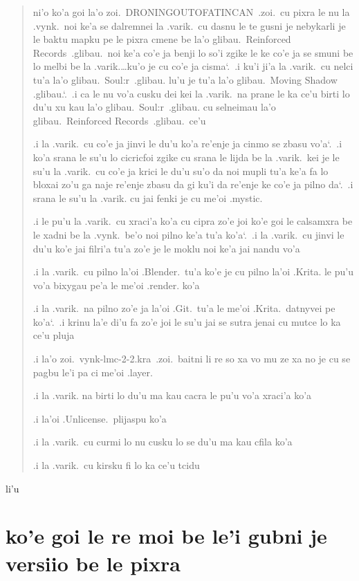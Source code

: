 \documentclass{report}
\newcommand\sds{\spacefactor\sfcode`.\ \space}
\begin{document}
\begin{quote}
	ni'o ko'a goi la'o zoi.\ DRONINGOUTOFATINCAN\ .zoi.\ cu pixra le nu la .vynk.\ noi ke'a se dalremnei la .varik.\ cu dasnu le te gusni je nebykarli je le baktu mapku pe le pixra cmene be la'o glibau.\ Reinforced Records\ .glibau.\ noi ke'a co'e ja benji lo so'i zgike le ke co'e ja se smuni be lo melbi be la .varik.\ldots ku'o je cu co'e ja cisma\sds  .i ku'i ji'a la .varik.\ cu nelci tu'a la'o glibau.\ Soul:r\ .glibau. lu'u je tu'a la'o glibau.\ Moving Shadow .glibau.\sds  .i ca le nu vo'a cusku dei kei la .varik.\ na prane le ka ce'u birti lo du'u xu kau la'o glibau.\ Soul:r\ .glibau. cu selneimau la'o glibau.\ Reinforced Records\ .glibau.\ ce'u

	.i la .varik.\ cu co'e ja jinvi le du'u ko'a re'enje ja cinmo se zbasu vo'a\sds  .i ko'a srana le su'u lo cicricfoi zgike cu srana le lijda be la .varik.\ kei je le su'u la .varik.\ cu co'e ja krici le du'u su'o da noi mupli tu'a ke'a fa lo bloxai zo'u ga naje re'enje zbasu da gi ku'i da re'enje ke co'e ja pilno da\sds  .i srana le su'u la .varik. cu jai fenki je cu me'oi .mystic.

	.i le pu'u la .varik.\ cu xraci'a ko'a cu cipra zo'e joi ko'e goi le calsamxra be le xadni be la .vynk.\ be'o noi pilno ke'a tu'a ko'a\sds  .i la .varik.\ cu jinvi le du'u ko'e jai filri'a tu'a zo'e je le moklu noi ke'a jai nandu vo'a

	.i la .varik.\ cu pilno la'oi .Blender.\ tu'a ko'e je cu pilno la'oi .Krita. le pu'u vo'a bixygau pe'a le me'oi .render. ko'a

	.i la .varik.\ na pilno zo'e ja la'oi .Git.\ tu'a le me'oi .Krita.\ datnyvei pe ko'a\sds  .i krinu la'e di'u fa zo'e joi le su'u jai se sutra jenai cu mutce lo ka ce'u pluja

	.i la'o zoi.\ vynk-lmc-2-2.kra\ .zoi.\ baitni li re so xa vo mu ze xa no je cu se pagbu le'i pa ci me'oi .layer.

	.i la .varik. na birti lo du'u ma kau cacra le pu'u vo'a xraci'a ko'a

	.i la'oi .Unlicense.\ plijaspu ko'a

	.i la .varik.\ cu curmi lo nu cusku lo se du'u ma kau cfila ko'a

	.i la .varik.\ cu kirsku fi lo ka ce'u tcidu
\end{quote}

li'u

\section{ko'e goi le re moi be le'i gubni je versiio be le pixra}
\end{document}
